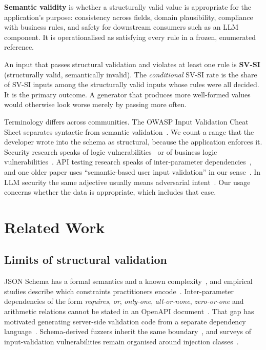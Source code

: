 \documentclass[conference]{IEEEtran}
\begin{document}
\textbf{Semantic validity} is whether a structurally valid value is appropriate for the application's
purpose: consistency across fields, domain plausibility, compliance with business rules, and safety
for downstream consumers such as an LLM component. It is operationalised as satisfying every rule in a
frozen, enumerated reference.

An input that passes structural validation and violates at least one rule is \textbf{SV-SI}
(structurally valid, semantically invalid). The \emph{conditional} SV-SI rate is the share of SV-SI
inputs among the structurally valid inputs whose rules were all decided. It is the primary outcome. A
generator that produces more well-formed values would otherwise look worse merely by passing more
often.

Terminology differs across communities. The OWASP Input Validation Cheat Sheet separates syntactic from
semantic validation~\cite{owasp2026inputvalidation}. We count a range that the developer wrote into the
schema as structural, because the application enforces it. Security research speaks of logic
vulnerabilities~\cite{felmetsger2010waler,pellegrino2014logicflaws} or of business logic
vulnerabilities~\cite{metin2025blv}. API testing research speaks of inter-parameter
dependencies~\cite{martinlopez2022idl,martinlopez2019catalogue}, and one older paper uses
``semantic-based user input validation'' in our sense~\cite{hanna2018semanticvalidation}. In LLM
security the same adjective usually means adversarial intent~\cite{singh2026injectioninteraction}. Our
usage concerns whether the data is appropriate, which includes that case.

\section{Related Work}
\label{sec:related}

\subsection{Limits of structural validation}
JSON Schema has a formal semantics and a known complexity~\cite{pezoa2016foundations,attouche2023jsonschema},
and empirical studies describe which constraints practitioners encode~\cite{baazizi2021usagenot}.
Inter-parameter dependencies of the form \emph{requires}, \emph{or}, \emph{only-one},
\emph{all-or-none}, \emph{zero-or-one} and arithmetic relations cannot be stated in an OpenAPI
document~\cite{martinlopez2022idl,martinlopez2019catalogue}. That gap has motivated generating
server-side validation code from a separate dependency language~\cite{barakat2023idlgen}.
Schema-derived fuzzers inherit the same boundary~\cite{hatfielddodds2021schemathesis}, and surveys of
input-validation vulnerabilities remain organised around injection
classes~\cite{fadlalla2023inputvalidation}.
\end{document}
